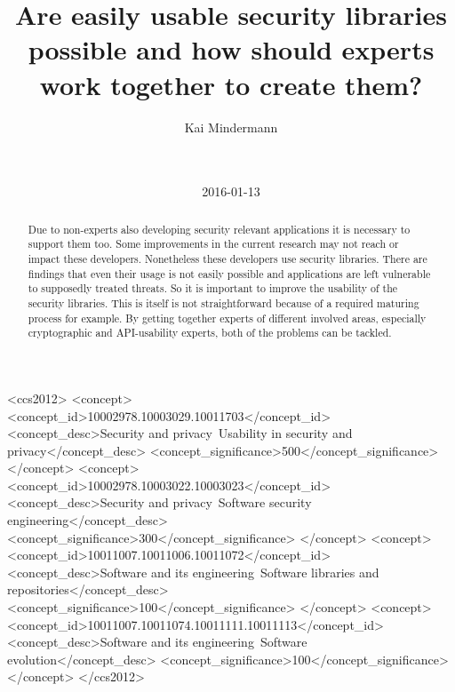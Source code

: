 \documentclass{sig-alternate-05-2015}
\begin{document}







\title{Are easily usable security libraries possible and how should experts work together to create them?}


 \author{
\alignauthor
Kai Mindermann\\
       \\
       \\
}
\date{2016-01-13}

\maketitle
\begin{abstract}
Due to non-experts also developing security relevant applications it is necessary to support them too. Some improvements in the current research may not reach or impact these developers. Nonetheless these developers use security libraries. There are findings that even their usage is not easily possible and applications are left vulnerable to supposedly treated threats. So it is important to improve the usability of the security libraries. This is itself is not straightforward because of a required maturing process for example. By getting together experts of different involved areas, especially cryptographic and API-usability experts, both of the problems can be tackled.
\end{abstract}


\begin{CCSXML}
<ccs2012>
<concept>
<concept_id>10002978.10003029.10011703</concept_id>
<concept_desc>Security and privacy~Usability in security and privacy</concept_desc>
<concept_significance>500</concept_significance>
</concept>
<concept>
<concept_id>10002978.10003022.10003023</concept_id>
<concept_desc>Security and privacy~Software security engineering</concept_desc>
<concept_significance>300</concept_significance>
</concept>
<concept>
<concept_id>10011007.10011006.10011072</concept_id>
<concept_desc>Software and its engineering~Software libraries and repositories</concept_desc>
<concept_significance>100</concept_significance>
</concept>
<concept>
<concept_id>10011007.10011074.10011111.10011113</concept_id>
<concept_desc>Software and its engineering~Software evolution</concept_desc>
<concept_significance>100</concept_significance>
</concept>
</ccs2012>
\end{CCSXML}
\end{document}
